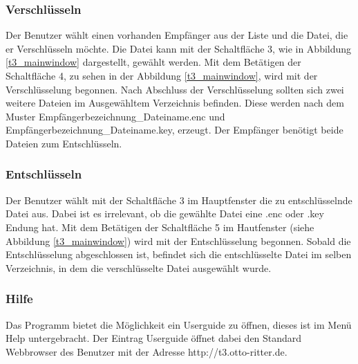 \documentclass[12pt,a4paper,titlepage]{article}
\begin{document}
\subsubsection{Verschlüsseln}
Der Benutzer wählt einen vorhanden Empfänger aus der Liste und die Datei, die er Verschlüsseln möchte. Die Datei kann mit der Schaltfläche 3, wie in Abbildung \ref{t3_mainwindow} dargestellt, gewählt werden. Mit dem Betätigen der Schaltfläche 4, zu sehen in der Abbildung \ref{t3_mainwindow}, wird mit der Verschlüsselung begonnen. Nach Abschluss der Verschlüsselung sollten sich zwei weitere Dateien im Ausgewähltem Verzeichnis befinden. Diese werden nach dem Muster Empfängerbezeichnung\_Dateiname.enc und Empfängerbezeichnung\_Dateiname.key, erzeugt. Der Empfänger benötigt beide Dateien zum Entschlüsseln.
\subsubsection{Entschlüsseln}
Der Benutzer wählt mit der Schaltfläche 3 im Hauptfenster die zu entschlüsselnde Datei aus. Dabei ist es irrelevant, ob die gewählte Datei eine .enc oder .key Endung hat. Mit dem Betätigen der Schaltfläche 5 im Hautfenster (siehe Abbildung \ref{t3_mainwindow}) wird mit der Entschlüsselung begonnen. Sobald die Entschlüsselung abgeschlossen ist, befindet sich die entschlüsselte Datei im selben Verzeichnis, in dem die verschlüsselte Datei ausgewählt wurde.
\subsubsection{Hilfe}
Das Programm bietet die Möglichkeit ein Userguide zu öffnen, dieses ist im Menü Help untergebracht. Der Eintrag Userguide öffnet dabei den Standard Webbrowser des Benutzer mit der Adresse http://t3.otto-ritter.de. 

\end{document}
